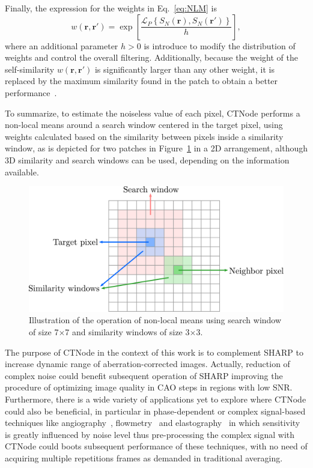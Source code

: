 Finally, the expression for the weights in Eq.~\eqref{eq:NLM} is 
\begin{equation}
    w(\bm{r}, \bm{r}') = \exp\left[\frac{\mathcal{L}_{P}\left\{S_N(\bm{r}), S_N(\bm{r}')\right\}}{h}\right],
\end{equation}
where an additional parameter $h>0$ is introduce to modify the distribution of weights and control the overall filtering. Additionally, because the weight of the self-similarity $w(\bm{r}, \bm{r}')$ is significantly larger than any other weight, it is replaced by the maximum similarity found in the patch to obtain a better performance~\cite{Cuartas-Velez2018_Volumetric}.

To summarize, to estimate the noiseless value of each pixel, CTNode performs a non-local means around a search window centered in the target pixel, using weights calculated based on the similarity between pixels inside a similarity window, as is depicted for two patches in Figure~\ref{fig:CTNodeScheme} in a 2D arrangement, although 3D similarity and search windows can be used, depending on the information available. 

\begin{figure}[htb!]
	\centering
	\includegraphics[width=.8\textwidth]{Figures/SHARP/CTNodeScheme.pdf}
	\caption[Illustration of the operation of non-local means.]{Illustration of the operation of non-local means using search window of size 7$\times$7 and similarity windows of size 3$\times$3.}
	\label{fig:CTNodeScheme}
\end{figure}

The purpose of CTNode in the context of this work is to complement SHARP to increase dynamic range of aberration-corrected images. Actually, reduction of complex noise could benefit subsequent operation of SHARP improving the procedure of optimizing image quality in CAO steps in regions with low SNR. Furthermore, there is a wide variety of applications yet to explore where CTNode could also be beneficial, in particular in phase-dependent or complex signal-based techniques like angiography~\cite{Makita2016_Noiseimmune}, flowmetry~\cite{Uribe-Patarroyo2014_Quantitative} and elastography~\cite{Wang2007_Phasesensitive} in which sensitivity is greatly influenced by noise level thus pre-processing the complex signal with CTNode could boots subsequent performance of these techniques, with no need of acquiring multiple repetitions frames as demanded in traditional averaging.

